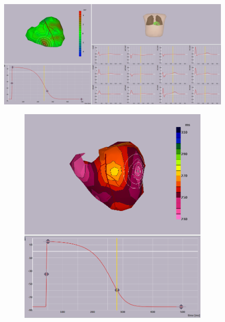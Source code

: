\documentclass[12pt]{article}
\begin{document}
\begin{figure}[H]
	
	\centering
	\includegraphics[width = .8\textwidth]{Figures/RecoPots.png}
	\caption{}
	\label{fig:RecT_pot}
\end{figure}

\begin{figure}[H]
	\centering
	\begin{subfigure}{0.45\textwidth}
		\centering
		\includegraphics[width = \textwidth]{Figures/EpiADP.png}
		\caption{}
		\label{APD:epi}
	\end{subfigure}
	\begin{subfigure}{0.45\textwidth}
		\centering

\end{subfigure}
\end{figure}
\end{document}
